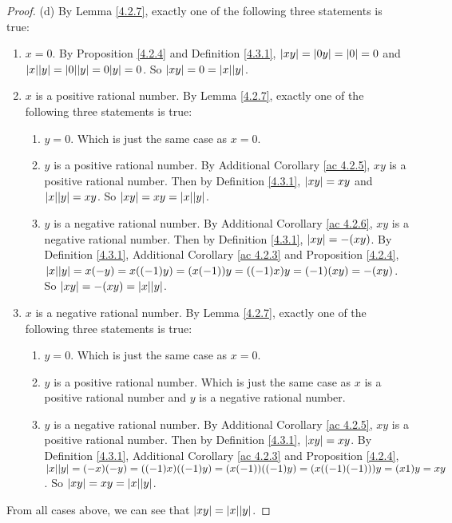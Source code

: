 \begin{proof}{(d)}
    By Lemma \ref{4.2.7}, exactly one of the following three statements is true:
    \begin{enumerate}[label=(\Roman*)]
        \item \(x = 0\).
              By Proposition \ref{4.2.4} and Definition \ref{4.3.1}, \(\abs*{xy} = \abs*{0y} = \abs*{0} = 0\) and \(\abs*{x}\abs*{y} = \abs*{0}\abs*{y} = 0\abs*{y} = 0\).
              So \(\abs*{xy} = 0 = \abs*{x}\abs*{y}\).
        \item \(x\) is a positive rational number.
              By Lemma \ref{4.2.7}, exactly one of the following three statements is true:
              \begin{enumerate}[label=(\roman*)]
                  \item \(y = 0\).
                        Which is just the same case as \(x = 0\).
                  \item \(y\) is a positive rational number.
                        By Additional Corollary \ref{ac 4.2.5}, \(xy\) is a positive rational number.
                        Then by Definition \ref{4.3.1}, \(\abs*{xy} = xy\) and \(\abs*{x}\abs*{y} = xy\).
                        So \(\abs*{xy} = xy = \abs*{x}\abs*{y}\).
                  \item \(y\) is a negative rational number.
                        By Additional Corollary \ref{ac 4.2.6}, \(xy\) is a negative rational number.
                        Then by Definition \ref{4.3.1}, \(\abs*{xy} = -(xy)\).
                        By Definition \ref{4.3.1}, Additional Corollary \ref{ac 4.2.3} and Proposition \ref{4.2.4}, \(\abs*{x}\abs*{y} = x(-y) = x((-1)y) = (x(-1))y = ((-1)x)y = (-1)(xy) = -(xy)\).
                        So \(\abs*{xy} = -(xy) = \abs*{x}\abs*{y}\).
              \end{enumerate}
        \item \(x\) is a negative rational number.
              By Lemma \ref{4.2.7}, exactly one of the following three statements is true:
              \begin{enumerate}[label=(\roman*)]
                  \item \(y = 0\).
                        Which is just the same case as \(x = 0\).
                  \item \(y\) is a positive rational number.
                        Which is just the same case as \(x\) is a positive rational number and \(y\) is a negative rational number.
                  \item \(y\) is a negative rational number.
                        By Additional Corollary \ref{ac 4.2.5}, \(xy\) is a positive rational number.
                        Then by Definition \ref{4.3.1}, \(\abs*{xy} = xy\).
                        By Definition \ref{4.3.1}, Additional Corollary \ref{ac 4.2.3} and Proposition \ref{4.2.4}, \(\abs*{x}\abs*{y} = (-x)(-y) = ((-1)x)((-1)y) = (x(-1))((-1)y) = (x((-1)(-1)))y = (x1)y = xy\).
                        So \(\abs*{xy} = xy = \abs*{x}\abs*{y}\).
              \end{enumerate}
    \end{enumerate}
    From all cases above, we can see that \(\abs*{xy} = \abs*{x}\abs*{y}\).


\end{proof}
